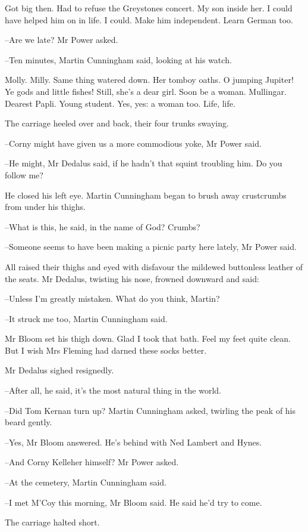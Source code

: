 Got big then.
Had to refuse the Greystones concert.
My son inside her.
I could have helped him on in life.
I could.
Make him independent.
Learn German too.

--Are we late?
Mr Power asked.

--Ten minutes,
Martin Cunningham said, looking at his watch.

Molly.
Milly.
Same thing watered down.
Her tomboy oaths.
O jumping Jupiter!
Ye gods and little fishes!
Still, she's a dear girl.
Soon be a woman.
Mullingar.
Dearest Papli.
Young student.
Yes, yes:
a woman too.
Life, life.

The carriage heeled over and back,
their four trunks swaying.

--Corny might have given us a more commodious yoke,
Mr Power said.

--He might,
Mr Dedalus said,
if he hadn't that squint troubling him.
Do you follow me?

He closed his left eye.
Martin Cunningham began to brush away crustcrumbs from under his thighs.

--What is this,
he said,
in the name of God?
Crumbs?

--Someone seems to have been making a picnic party here lately,
Mr Power said.

All raised their thighs and eyed with disfavour
the mildewed buttonless leather of the seats.
Mr Dedalus, twisting his nose, frowned downward and said:

--Unless I'm greatly mistaken.
What do you think, Martin?

--It struck me too,
Martin Cunningham said.

Mr Bloom set his thigh down.
Glad I took that bath.
Feel my feet quite clean.
But I wish Mrs Fleming had darned these socks better.

Mr Dedalus sighed resignedly.

--After all,
he said,
it's the most natural thing in the world.

--Did Tom Kernan turn up?
Martin Cunningham asked,
twirling the peak of his beard gently.

--Yes,
Mr Bloom answered.
He's behind with Ned Lambert and Hynes.

--And Corny Kelleher himself?
Mr Power asked.

--At the cemetery,
Martin Cunningham said.

--I met M'Coy this morning,
Mr Bloom said.
He said he'd try to come.

The carriage halted short.

